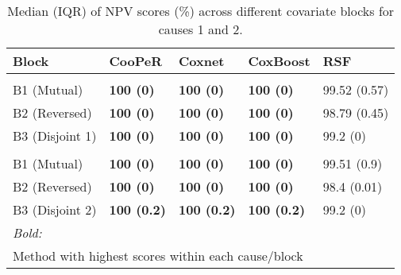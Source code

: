 \begin{table}
\centering
\caption{Median (IQR) of NPV scores (\%) across different covariate blocks for causes 1 and 2.\label{tab:npv-median}}
\centering
\begin{tabular}[t]{lllll}
\toprule
Block & CooPeR & Coxnet & CoxBoost & RSF\\
\midrule
\addlinespace[0.3em]
\multicolumn{5}{l}{\textbf{Cause 1}}\\
\hspace{1em}B1 (Mutual) & \textbf{100 (0)} & \textbf{100 (0)} & \textbf{100 (0)} & 99.52 (0.57)\\
\hspace{1em}B2 (Reversed) & \textbf{100 (0)} & \textbf{100 (0)} & \textbf{100 (0)} & 98.79 (0.45)\\
\hspace{1em}B3 (Disjoint 1) & \textbf{100 (0)} & \textbf{100 (0)} & \textbf{100 (0)} & 99.2 (0)\\
\addlinespace[0.3em]
\multicolumn{5}{l}{\textbf{Cause 2}}\\
\hspace{1em}B1 (Mutual) & \textbf{100 (0)} & \textbf{100 (0)} & \textbf{100 (0)} & 99.51 (0.9)\\
\hspace{1em}B2 (Reversed) & \textbf{100 (0)} & \textbf{100 (0)} & \textbf{100 (0)} & 98.4 (0.01)\\
\hspace{1em}B3 (Disjoint 2) & \textbf{100 (0.2)} & \textbf{100 (0.2)} & \textbf{100 (0.2)} & 99.2 (0)\\
\bottomrule
\multicolumn{5}{l}{\rule{0pt}{1em}\textit{Bold:}}\\
\multicolumn{5}{l}{\rule{0pt}{1em}Method with highest scores within each cause/block}\\
\end{tabular}
\end{table}
